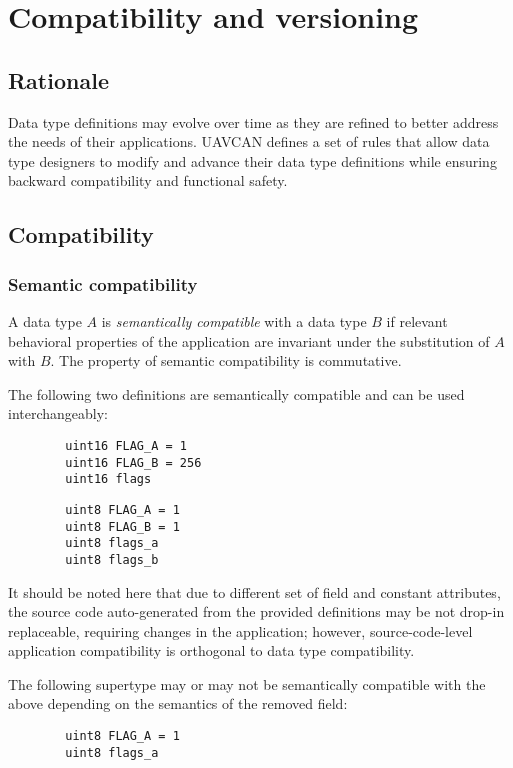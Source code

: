 \section{Compatibility and versioning}\label{sec:dsdl_versioning}

\subsection{Rationale}

Data type definitions may evolve over time as they are refined to better address the needs of their applications.
UAVCAN defines a set of rules that allow data type designers to modify and advance their
data type definitions while ensuring backward compatibility and functional safety.

\subsection{Compatibility}

\subsubsection{Semantic compatibility}\label{sec:dsdl_semantic_compatibility}

A data type $A$ is \emph{semantically compatible} with a data type $B$
if relevant behavioral properties of the application are invariant under the substitution of $A$ with $B$.
The property of semantic compatibility is commutative.

\begin{remark}[breakable]
    The following two definitions are semantically compatible and can be used interchangeably:

    \begin{verbatim}
        uint16 FLAG_A = 1
        uint16 FLAG_B = 256
        uint16 flags
    \end{verbatim}

    \begin{verbatim}
        uint8 FLAG_A = 1
        uint8 FLAG_B = 1
        uint8 flags_a
        uint8 flags_b
    \end{verbatim}

    It should be noted here that due to different set of field and constant attributes,
    the source code auto-generated from the provided definitions may be not drop-in replaceable,
    requiring changes in the application;
    however, source-code-level application compatibility is orthogonal to data type compatibility.

    The following supertype may or may not be semantically compatible with the above
    depending on the semantics of the removed field:

    \begin{verbatim}
        uint8 FLAG_A = 1
        uint8 flags_a
    \end{verbatim}
\end{remark}

